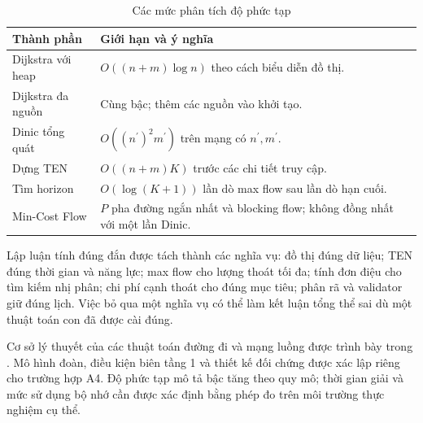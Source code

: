 \begin{table}[htbp]\centering\caption{Các mức phân tích độ phức tạp}
\small\begin{tabularx}{\linewidth}{P{4cm}X}\toprule
Thành phần & Giới hạn và ý nghĩa\\\midrule
Dijkstra với heap & $O((n+m)\log n)$ theo cách biểu diễn đồ thị.\\
Dijkstra đa nguồn & Cùng bậc; thêm các nguồn vào khởi tạo.\\
Dinic tổng quát & $O((n^{\prime})^2m^{\prime})$ trên mạng có $n^{\prime},m^{\prime}$.\\
Dựng TEN & $O((n+m)K)$ trước các chi tiết truy cập.\\
Tìm horizon & $O(\log(K+1))$ lần dò max flow sau lần dò hạn cuối.\\
Min-Cost Flow & $P$ pha đường ngắn nhất và blocking flow; không đồng nhất với một lần Dinic.\\\bottomrule
\end{tabularx}\end{table}

Lập luận tính đúng đắn được tách thành các nghĩa vụ: đồ thị đúng dữ liệu; TEN đúng thời gian và năng lực; max flow cho lượng thoát tối đa; tính đơn điệu cho tìm kiếm nhị phân; chi phí cạnh thoát cho đúng mục tiêu; phân rã và validator giữ đúng lịch. Việc bỏ qua một nghĩa vụ có thể làm kết luận tổng thể sai dù một thuật toán con đã được cài đúng.

Cơ sở lý thuyết của các thuật toán đường đi và mạng luồng được trình bày trong \cite{clrs}. Mô hình đoàn, điều kiện biên tầng 1 và thiết kế đối chứng được xác lập riêng cho trường hợp A4. Độ phức tạp mô tả bậc tăng theo quy mô; thời gian giải và mức sử dụng bộ nhớ cần được xác định bằng phép đo trên môi trường thực nghiệm cụ thể.
